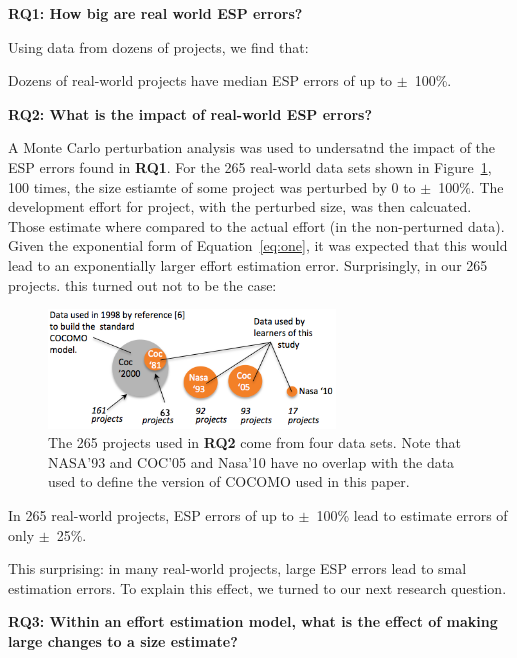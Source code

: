 \documentclass[final,twocolumn]{elsarticle}
\newcommand{\fig}[1]{Figure~\ref{fig:#1}}
\newcommand{\eq}[1]{Equation~\ref{eq:#1}}
\theoremstyle{break}
\begin{document}
{\bf RQ1: How big are real world ESP errors?}

Using data from dozens of projects, we find that:

\begin{lesson0}
  Dozens of real-world projects have median ESP errors of up to $\pm$~100\%.
\end{lesson0}

{\bf RQ2: What is the impact of real-world ESP errors?}

A Monte Carlo perturbation analysis was used
to undersatnd the impact of the ESP errors found in {\bf RQ1}.
For the 265 real-world data sets shown in \fig{dataused}, 100 times, the size estiamte of some project was perturbed by
0 to $\pm$~100\%. The development effort
for project, with the perturbed size, was then calcuated.
Those  estimate where  compared to the actual effort (in the non-perturned data).
Given the exponential form of \eq{one}, it was expected that this would
lead to an exponentially larger effort estimation error. Surprisingly,
in our 265 projects.
this turned out not to be the case:

\begin{figure}[!t]
\begin{center}
\includegraphics[width=3in]{Figs/datasets1.png}
\end{center}
\caption{The 265 projects used in {\bf RQ2}
  come from four data sets.
   Note that NASA'93 and
COC'05 and Nasa'10 have no
overlap with the data used to define the version of COCOMO
used in this paper.}
\label{fig:dataused}
\end{figure}

\begin{lesson0}
  In 265 real-world projects,
  ESP errors of up to $\pm$~100\% lead to estimate errors of only $\pm$~25\%.
\end{lesson0}

This surprising: in many real-world projects, large ESP errors
lead to  smal estimation errors.
To explain this effect, we turned to our next research question.

{\bf RQ3:
Within an effort estimation model, what is the effect of making large changes to a size estimate?}
\end{document}
